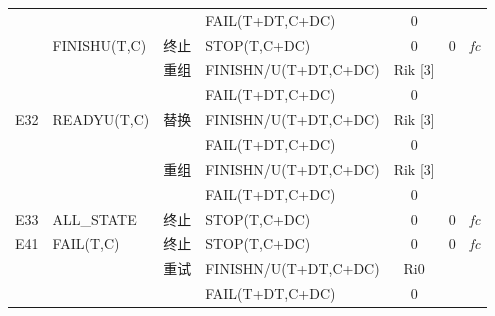 \begin{table}[htbp]
\begin{tabular}{rrcrcrr}
        \multicolumn{1}{c}{} & \multicolumn{1}{l}{} &       & \multicolumn{1}{l}{FAIL(T+DT,C+DC)} & 0     & \multicolumn{1}{c}{} & \multicolumn{1}{c}{} \\
        \multicolumn{1}{c}{} & \multicolumn{1}{l}{\multirow{3}[6]{*}{FINISHU(T,C)}} & 终止    & \multicolumn{1}{l}{STOP(T,C+DC)} & 0     & \multicolumn{1}{c}{0} & \multicolumn{1}{c}{\textit{fc}} \\
        \multicolumn{1}{c}{} & \multicolumn{1}{l}{} & \multirow{2}[4]{*}{重组} & \multicolumn{1}{l}{FINISHN/U(T+DT,C+DC)} & Rik  [3] & \multicolumn{1}{c}{\multirow{2}[4]{*}{}} & \multicolumn{1}{c}{\multirow{2}[4]{*}{}} \\
        \multicolumn{1}{c}{} & \multicolumn{1}{l}{} &       & \multicolumn{1}{l}{FAIL(T+DT,C+DC)} & 0     & \multicolumn{1}{c}{} & \multicolumn{1}{c}{} \\
        \multicolumn{1}{c}{\multirow{4}[8]{*}{E32}} & \multicolumn{1}{l}{\multirow{4}[8]{*}{READYU(T,C)}} & \multirow{2}[4]{*}{替换} & \multicolumn{1}{l}{FINISHN/U(T+DT,C+DC)} & Rik  [3] & \multicolumn{1}{c}{\multirow{2}[4]{*}{}} & \multicolumn{1}{c}{\multirow{2}[4]{*}{}} \\
        \multicolumn{1}{c}{} & \multicolumn{1}{l}{} &       & \multicolumn{1}{l}{FAIL(T+DT,C+DC)} & 0     & \multicolumn{1}{c}{} & \multicolumn{1}{c}{} \\
        \multicolumn{1}{c}{} & \multicolumn{1}{l}{} & \multirow{2}[4]{*}{重组} & \multicolumn{1}{l}{FINISHN/U(T+DT,C+DC)} & Rik  [3] & \multicolumn{1}{c}{\multirow{2}[4]{*}{}} & \multicolumn{1}{c}{\multirow{2}[4]{*}{}} \\
        \multicolumn{1}{c}{} & \multicolumn{1}{l}{} &       & \multicolumn{1}{l}{FAIL(T+DT,C+DC)} & 0     & \multicolumn{1}{c}{} & \multicolumn{1}{c}{} \\
        \multicolumn{1}{c}{E33} & \multicolumn{1}{l}{ALL\_STATE} & 终止    & \multicolumn{1}{l}{STOP(T,C+DC)} & 0     & \multicolumn{1}{c}{0} & \multicolumn{1}{c}{\textit{fc}} \\
        \multicolumn{1}{c}{\multirow{7}[14]{*}{E41}} & \multicolumn{1}{l}{\multirow{7}[14]{*}{FAIL(T,C)}} & 终止    & \multicolumn{1}{l}{STOP(T,C+DC)} & 0     & \multicolumn{1}{c}{0} & \multicolumn{1}{c}{\textit{fc}} \\
        \multicolumn{1}{c}{} & \multicolumn{1}{l}{} & \multirow{2}[4]{*}{重试} & \multicolumn{1}{l}{FINISHN/U(T+DT,C+DC)} & Ri0   & \multicolumn{1}{c}{\multirow{2}[4]{*}{}} & \multicolumn{1}{c}{\multirow{2}[4]{*}{}} \\
        \multicolumn{1}{c}{} & \multicolumn{1}{l}{} &       & \multicolumn{1}{l}{FAIL(T+DT,C+DC)} & 0     & \multicolumn{1}{c}{} & \multicolumn{1}{c}{} \\

\end{tabular}
\end{table}

